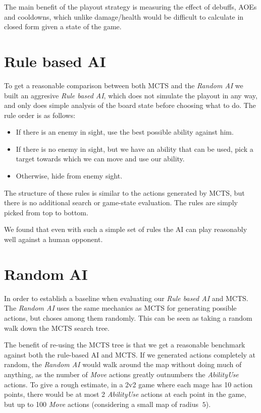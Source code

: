 The main benefit of the playout strategy is measuring the effect of debuffs, AOEs and cooldowns,
which unlike damage/health would be difficult to calculate in closed form given a state of the game.


\section{Rule based AI}

To get a reasonable comparison between both MCTS and the \emph{Random AI} we
built an aggresive \emph{Rule based AI}, which does not simulate the playout in
any way, and only does simple analysis of the board state before choosing what
to do. The rule order is as follows:

\begin{itemize}[align=right,labelwidth=3cm]
\item If there is an enemy in sight, use the best possible ability against him.
\item If there is no enemy in sight, but we have an ability that can be used, pick a target towards which we can move and use our ability.
\item Otherwise, hide from enemy sight.
\end{itemize}

The structure of these rules is similar to the actions generated by MCTS,
but there is no additional search or game-state evaluation. The rules are
simply picked from top to bottom.

We found that even with such a simple set of rules the AI can play reasonably
well against a human opponent.


\section{Random AI}

In order to establish a baseline when evaluating our \emph{Rule based AI} and MCTS\@.
The \emph{Random AI} uses the same mechanics as MCTS for generating possible actions,
but choses among them randomly. This can be seen as taking a random walk down
the MCTS search tree.

The benefit of re-using the MCTS tree is that we get a reasonable benchmark against
both the rule-based AI and MCTS\@. If we generated actions completely at random, the \emph{Random AI}
would walk around the map without doing much of anything, as the number of \emph{Move} actions
greatly outnumbers the \emph{AbilityUse} actions. To give a rough estimate, in a 2v2 game where
each mage has 10 action points, there would be at most 2 \emph{AbilityUse} actions at each point
in the game, but up to 100 \emph{Move} actions (considering a small map of radius $~5$).

